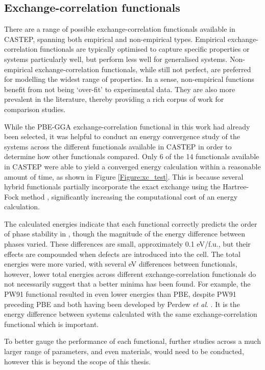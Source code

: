 \subsection{Exchange-correlation functionals}

There are a range of possible exchange-correlation functionals available in CASTEP, spanning both empirical and non-empirical types. Empirical exchange-correlation functionals are typically optimised to capture specific properties or systems particularly well, but perform less well for generalised systems. Non-empirical exchange-correlation functionals, while still not perfect, are preferred for modelling the widest range of properties. In a sense, non-empirical functions benefit from not being `over-fit' to experimental data. They are also more prevalent in the literature, thereby providing a rich corpus of work for comparison studies.

While the PBE-GGA exchange-correlation functional in this work had already been selected, it was helpful to conduct an energy convergence study of the systems across the different functionals available in CASTEP in order to determine how other functionals compared. Only 6 of the 14 functionals available in CASTEP were able to yield a converged energy calculation within a reasonable amount of time, as shown in Figure \ref{Figure:xc_test}. This is because several hybrid functionals partially incorporate the exact exchange using the Hartree-Fock method \cite{hartree1928wave}, significantly increasing the computational cost of an energy calculation. 

The calculated energies indicate that each functional correctly predicts the order of phase stability in \zirconia , though the magnitude of the energy difference between phases varied. These differences are small, approximately 0.1 eV/f.u., but their effects are compounded when defects are introduced into the cell. The total energies were more varied, with several eV differences between functionals, however, lower total energies across different exchange-correlation functionals do not necessarily suggest that a better minima has been found. For example, the PW91 functional resulted in even lower energies than PBE, despite PW91 preceding PBE and both having been developed by Perdew \emph{et al}. \cite{perdew1991unified, perdew1992atoms}. It is the energy difference between systems calculated with the same exchange-correlation functional which is important. 

To better gauge the performance of each functional, further studies across a much larger range of parameters, and even materials, would need to be conducted, however this is beyond the scope of this thesis.

